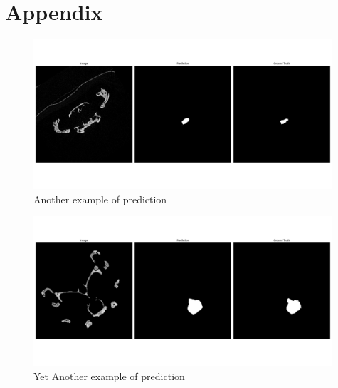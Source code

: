 \chapter*{Appendix}
\begin{figure}[!htb]
    \centering
    \includegraphics[width=0.99\textwidth]{images/results/prediction2.png}
    \caption{Another example of prediction}
    \label{fig::Prediction2}
\end{figure}
\begin{figure}[!htb]
    \centering
    \includegraphics[width=0.99\textwidth]{images/results/prediction3.png}
    \caption{Yet Another example of prediction}
    \label{fig::Prediction3}
\end{figure}